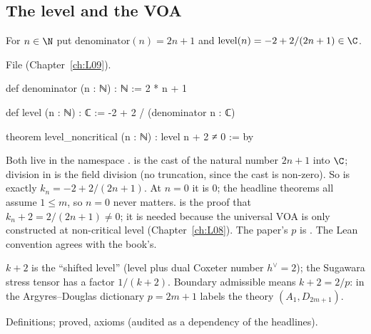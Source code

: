 \subsection{The level and the VOA}

\begin{definition}\label{l20:def:level}
For $n\in\N$ put $\mathrm{denominator}(n)=2n+1$ and $\mathrm{level}(n)=-2+2/(2n+1)\in\C$.
\end{definition}
\noindent File 
(Chapter~\ref{ch:L09}).
\begin{leancode}
def denominator (n : ℕ) : ℕ := 2 * n + 1

def level (n : ℕ) : ℂ := -2 + 2 / (denominator n : ℂ)

theorem level_noncritical (n : ℕ) : level n + 2 ≠ 0 := by
\end{leancode}

\begin{dictionary}
Both live in the namespace .  is the
cast of the natural number $2n+1$ into $\C$; division in  is the field division (no truncation, since
the cast is non-zero). So  is exactly $k_n=-2+2/(2n+1)$. At $n=0$ it is $0$; the headline
theorems all assume $1\le m$, so $n=0$ never matters.  is the proof that
$k_n+2=2/(2n+1)\neq0$; it is needed because the universal VOA is only constructed at non-critical level
(Chapter~\ref{ch:L08}). The paper's $p$ is . The Lean convention agrees with the book's.
\end{dictionary}

\begin{physics}
$k+2$ is the ``shifted level'' (level plus dual Coxeter number $h^\vee=2$); the Sugawara stress tensor has a
factor $1/(k+2)$. Boundary admissible means $k+2=2/p$: in the Argyres--Douglas dictionary $p=2m+1$ labels the
theory $(A_1,D_{2m+1})$.
\end{physics}

\begin{status}
Definitions;  proved, axioms  (audited
as a dependency of the headlines).
\end{status}

